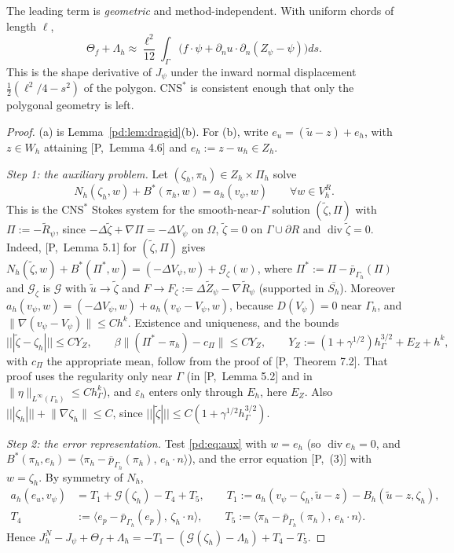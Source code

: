 \documentclass[11pt,reqno]{amsart}
\theoremstyle{plain}
\theoremstyle{definition}
\newcommand{\hG}{h_\Gamma}
\newcommand{\Gh}{\Gamma_h}
\newcommand{\VR}{V_h^R}
\newcommand{\Pih}{\Pi_h}
\newcommand{\Zh}{Z_h}
\newcommand{\Wh}{W_h}
\newcommand{\dn}{\partial_n}
\newcommand{\ut}{\tilde u}
\newcommand{\pbar}{\bar p}
\newcommand{\ip}[2]{\langle #1,\, #2\rangle}
\newcommand{\tnorm}[1]{|\!|\!|#1|\!|\!|}
\newcommand{\norm}[1]{\lVert #1\rVert}
\newcommand{\CNS}{\mathrm{CNS}^\ast}
\newcommand{\eps}{\varepsilon_h}
\renewcommand{\div}{\operatorname{div}}
\newcommand{\Gc}{\mathcal G}
\newcommand{\Pref}[1]{\textup{[P,~#1]}}
\newcommand{\Bh}{B_h}
\begin{document}
The leading term is \emph{geometric} and method-independent. With uniform chords of length $\ell$,
\[
\Theta_f+\Lambda_h\approx\frac{\ell^2}{12}\int_\Gamma\bigl(f\cdot\psi+\dn u\cdot\dn(Z_\psi-\psi)\bigr)ds .
\]
This is the shape derivative of $J_\psi$ under the inward normal displacement $\frac12(\ell^2/4-s^2)$ of the polygon. $\CNS$ is consistent enough that only the polygonal geometry is left.

\begin{proof}
(a) is Lemma~\ref{pd:lem:dragid}(b). For (b), write $e_u=(\ut-z)+e_h$, with $z\in\Wh$ attaining \Pref{Lemma 4.6} and $e_h:=z-u_h\in\Zh$.

\emph{Step 1: the auxiliary problem.} Let $(\zeta_h,\pi_h)\in\Zh\times\Pih$ solve
\begin{equation}\label{pd:eq:aux}
N_h(\zeta_h,w)+B^\ast(\pi_h,w)=a_h(v_\psi,w)\qquad\forall w\in\VR .
\end{equation}
This is the $\CNS$ Stokes system for the smooth-near-$\Gamma$ solution $(\tilde\zeta,\Pi)$ with $\Pi:=-\tilde R_\psi$, since $-\Delta\tilde\zeta+\nabla\Pi=-\Delta V_\psi$ on $\Omega$, $\tilde\zeta=0$ on $\Gamma\cup\partial R$ and $\div\tilde\zeta=0$. Indeed, \Pref{Lemma 5.1} for $(\tilde\zeta,\Pi)$ gives $N_h(\tilde\zeta,w)+B^\ast(\Pi^\ast,w)=(-\Delta V_\psi,w)+\Gc_\zeta(w)$, where $\Pi^\ast:=\Pi-\pbar_{\Gh}(\Pi)$ and $\Gc_\zeta$ is $\Gc$ with $\ut\to\tilde\zeta$ and $F\to F_\zeta:=\Delta\tilde Z_\psi-\nabla\tilde R_\psi$ (supported in $\overline{S_h}$). Moreover $a_h(v_\psi,w)=(-\Delta V_\psi,w)+a_h(v_\psi-V_\psi,w)$, because $D(V_\psi)=0$ near $\Gh$, and $\norm{\nabla(v_\psi-V_\psi)}\le Ch^k$. Existence and uniqueness, and the bounds
\[
\tnorm{\tilde\zeta-\zeta_h}\le CY_Z,\qquad\beta\norm{(\Pi^\ast-\pi_h)-c_\Pi}\le CY_Z,\qquad Y_Z:=(1+\gamma^{1/2})\hG^{3/2}+E_Z+h^k,
\]
with $c_\Pi$ the appropriate mean, follow from the proof of \Pref{Theorem 7.2}. That proof uses the regularity only near $\Gamma$ (in \Pref{Lemma 5.2} and in $\norm\eta_{L^\infty(\Gh)}\le C\hG^k$), and $\eps$ enters only through $E_h$, here $E_Z$. Also $\tnorm{\zeta_h}+\norm{\nabla\zeta_h}\le C$, since $\tnorm{\tilde\zeta}\le C(1+\gamma^{1/2}\hG^{3/2})$.

\emph{Step 2: the error representation.} Test \eqref{pd:eq:aux} with $w=e_h$ (so $\div e_h=0$, and $B^\ast(\pi_h,e_h)=\ip{\pi_h-\pbar_{\Gh}(\pi_h)}{e_h\cdot n}$), and the error equation \Pref{(3)} with $w=\zeta_h$. By symmetry of $N_h$,
\[
\begin{aligned}
a_h(e_u,v_\psi)&=T_1+\Gc(\zeta_h)-T_4+T_5,\qquad T_1:=a_h(v_\psi-\zeta_h,\ut-z)-\Bh(\ut-z,\zeta_h),\\
T_4&:=\ip{e_p-\pbar_{\Gh}(e_p)}{\zeta_h\cdot n},\qquad T_5:=\ip{\pi_h-\pbar_{\Gh}(\pi_h)}{e_h\cdot n}.
\end{aligned}
\]
Hence $J^N_h-J_\psi+\Theta_f+\Lambda_h=-T_1-(\Gc(\zeta_h)-\Lambda_h)+T_4-T_5$.


\end{proof}
\end{document}
